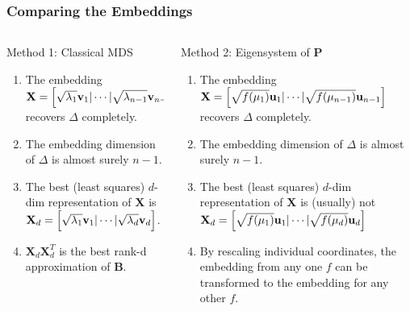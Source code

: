 \documentclass[professionalfonts, hyperref={pdfpagelabels=false,
  colorlinks=true, linkcolor=purple}]{beamer}
\begin{document}
\begin{frame}
 \frametitle{Comparing the Embeddings}
  \begin{columns}[t]
  \begin{column}{0.46\textwidth}
    Method 1: Classical MDS
    \vskip10pt
    \begin{enumerate}
    \item The embedding $\mathbf{X} = \Bigl[ \sqrt{\lambda_1} \mathbf{v}_1 |
        \cdots |
      \sqrt{\lambda_{n-1}} \mathbf{v}_{n-1} \Bigr]$ recovers
      $\Delta$ completely.
    \item The embedding dimension of $\Delta$
      is almost surely $n-1$.
    \item The best (least squares) $d$-dim representation of
      $\mathbf{X}$ is $\mathbf{X}_d =  \Bigl[ \sqrt{\lambda_1} \mathbf{v}_1 |
       \cdots |
      \sqrt{\lambda_d} \mathbf{v}_{d} \Bigr]$.
    \item $\mathbf{X}_d \mathbf{X}_d^{T}$ is the best
      rank-d approximation of $\mathbf{B}$.
    \end{enumerate}
  \end{column}
  
  \begin{column}{0.54\textwidth}
    Method 2: Eigensystem of $\mathbf{P}$
    \vskip10pt
    \begin{enumerate}
    \item The embedding 
      $\mathbf{X} = \Bigl[ \sqrt{f(\mu_1)} \mathbf{u}_1 |
       \cdots |
      \sqrt{f(\mu_{n-1})} \mathbf{u}_{n-1} \Bigr]$
      recovers 
      $\Delta$ completely.
    \item The embedding dimension of $\Delta$
     is almost surely $n-1$.
    \item The best (least squares) $d$-dim representation of
      $\mathbf{X}$ is (usually) \alert{not}
      $\mathbf{X}_d = \Bigl[ \sqrt{f(\mu_1)} \mathbf{u}_1 |
       \cdots |
      \sqrt{f(\mu_d)} \mathbf{u}_d \Bigr]$
   \item By rescaling individual coordinates, the embedding from any
     one $f$ can be transformed to the embedding for any other $f$.
    \end{enumerate}
  \end{column}
\end{columns}
\end{frame}
\end{document}
